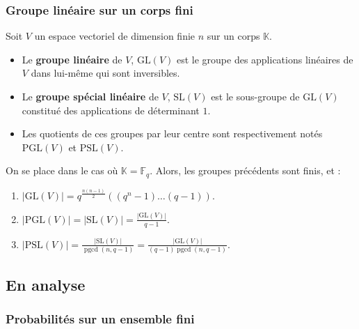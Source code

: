   \subsubsection{Groupe linéaire sur un corps fini}


  Soit $V$ un espace vectoriel de dimension finie $n$ sur un corps $\mathbb{K}$.

  \begin{definition}
    \begin{itemize}
      \item Le \textbf{groupe linéaire} de $V$, $\mathrm{GL}(V)$ est le groupe des applications linéaires de $V$ dans lui-même qui sont inversibles.
      \item Le \textbf{groupe spécial linéaire} de $V$, $\mathrm{SL}(V)$ est le sous-groupe de $\mathrm{GL}(V)$ constitué des applications de déterminant $1$.
      \item Les quotients de ces groupes par leur centre sont respectivement notés $\mathrm{PGL}(V)$ et $\mathrm{PSL}(V)$.
    \end{itemize}
  \end{definition}


  \begin{proposition}
    On se place dans le cas où $\mathbb{K} = \mathbb{F}_q$. Alors, les groupes précédents sont finis, et :
    \begin{enumerate}[label={\bfseries(\roman*)}]
      \item $|\mathrm{GL}(V)| = q^{\frac{n(n-1)}{2}}((q^n-1) \dots (q-1))$.
      \item $|\mathrm{PGL}(V)| = |\mathrm{SL}(V)| = \frac{|\mathrm{GL}(V)|}{q-1}$.
      \item $|\mathrm{PSL}(V)| = \frac{|\mathrm{SL}(V)|}{\operatorname{pgcd}(n,q-1)} = \frac{|\mathrm{GL}(V)|}{(q-1)\operatorname{pgcd}(n,q-1)}$.
    \end{enumerate}
  \end{proposition}

  \subsection{En analyse}

  \subsubsection{Probabilités sur un ensemble fini}

